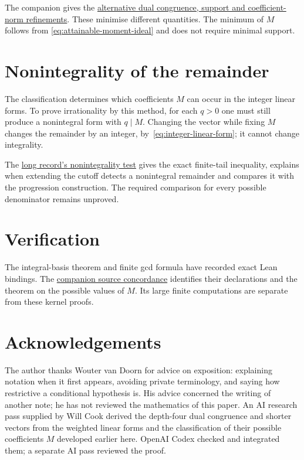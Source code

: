 \documentclass[11pt]{article}
\begin{document}
The companion gives the
\href{erdos68-factorial-reasoning-surface.pdf\#r5-depth-refinements}{alternative dual congruence, support and coefficient-norm refinements}.
These minimise different quantities. The minimum of $M$ follows from
\eqref{eq:attainable-moment-ideal} and does not require minimal support.

\section{Nonintegrality of the remainder}\label{sec:open}\label{sec:plateau}
The classification determines which coefficients $M$ can occur in the
integer linear forms. To prove irrationality by this method, for each
$q>0$ one must still produce a nonintegral form with $q\mid M$.
Changing the vector while fixing $M$ changes the remainder by an integer,
by~\eqref{eq:integer-linear-form}; it cannot change integrality.

The \href{erdos68-factorial-reasoning-surface.pdf\#r12-short-gap}
{long record's nonintegrality test} gives the exact finite-tail inequality,
explains when extending the cutoff detects a nonintegral remainder and
compares it with the progression construction. The required comparison
for every possible denominator remains unproved.

\section{Verification}\label{app:sources}

\evidenceparagraph{\evidencerecordurl}

The integral-basis theorem and finite gcd formula have
recorded exact Lean bindings. The
\href{erdos68-factorial-reasoning-surface.pdf\#r12-short-sources}{companion source concordance}
identifies their declarations and the theorem on the possible values of $M$. Its
large finite computations are separate from these kernel proofs.

\section*{Acknowledgements}
The author thanks Wouter van Doorn for advice on exposition: explaining notation when it first appears, avoiding private terminology, and saying how restrictive a conditional hypothesis is. His advice concerned the writing of another note; he has not reviewed the mathematics of this paper.
An AI research pass supplied by Will Cook derived the depth-four dual
congruence and shorter vectors from the weighted linear forms and the
classification of their possible coefficients $M$ developed earlier here. OpenAI Codex
checked and integrated them; a separate AI pass reviewed the proof.
\end{document}
